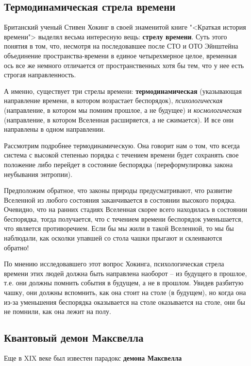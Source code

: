 \documentclass[12pt]{kiarticle}
\begin{document}
\subsection{Термодинамическая стрела времени}


Британский ученый Стивен Хокинг в своей знаменитой книге "<Краткая история времени"> выделял весьма интересную вещь: \textbf{стрелу времени}. Суть этого понятия в том, что, несмотря на последовавшее после СТО и ОТО Эйнштейна объединение пространства-времени в единое четырехмерное целое, временная ось все же немного отличается от пространственных хотя бы тем, что у нее есть строгая направленность. 

А именно, существует три стрелы времени: \textbf{термодинамическая} (указывающая направление времени, в котором возрастает беспорядок), \textit{психологическая} (направление, в котором мы помним прошлое, а не будущее) и \textit{космологическая} (направление, в котором Вселенная расширяется, а не сжимается). И все они направлены в одном направлении. 

Рассмотрим подробнее термодинамическую. Она говорит нам о том, что всегда система с высокой степенью порядка с течением времени будет сохранять свое положение либо перейдет в состояние беспорядка (переформулировка закона неубывания энтропии).

Предположим обратное, что законы природы предусматривают, что развитие Вселенной из любого состояния заканчивается в состоянии высокого порядка. Очевидно, что на ранних стадиях Вселенная скорее всего находилась в состоянии беспорядка, тогда получается, что с течением времени беспорядок уменьшается, что является противоречием. Если бы мы жили в такой Вселенной, то мы бы наблюдали, как осколки упавшей со стола чашки прыгают и склеиваются обратно! 

По мнению исследовавшего этот вопрос Хокинга, психологическая стрела времени этих людей должна быть направлена наоборот -- из будущего в прошлое, т.е. они должны помнить события в будущем, а не в прошлом. Увидев разбитую чашку, они должны вспомнить, как она стоит на столе (в будущем), но когда она из-за уменьшения беспорядка оказывается на столе оказывается на столе, они бы не помнили, как она лежит на полу. 

\subsection{Квантовый демон Максвелла}

Еще в XIX веке был известен парадокс \textbf{демона Максвелла}



%
%	
%	
\end{document}
